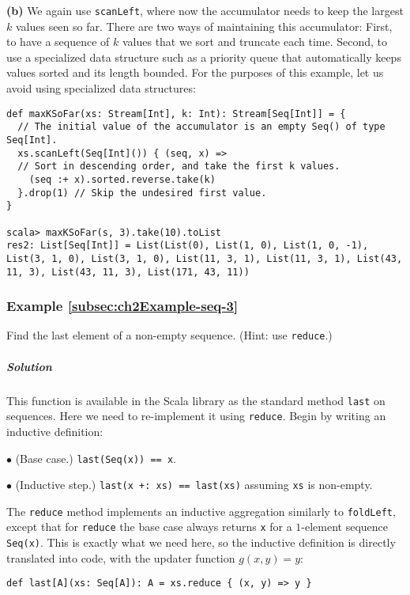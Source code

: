 \textbf{(b)} We again use \lstinline!scanLeft!, where now the accumulator
needs to keep the largest $k$ values seen so far. There are two ways
of maintaining this accumulator: First, to have a sequence of $k$
values that we sort and truncate each time. Second, to use a specialized
data structure such as a priority queue that automatically keeps values
sorted and its length bounded. For the purposes of this example, let
us avoid using specialized data structures:
\begin{lstlisting}
def maxKSoFar(xs: Stream[Int], k: Int): Stream[Seq[Int]] = {
  // The initial value of the accumulator is an empty Seq() of type Seq[Int].
  xs.scanLeft(Seq[Int]()) { (seq, x) =>
  // Sort in descending order, and take the first k values.
    (seq :+ x).sorted.reverse.take(k)
  }.drop(1) // Skip the undesired first value.
}

scala> maxKSoFar(s, 3).take(10).toList
res2: List[Seq[Int]] = List(List(0), List(1, 0), List(1, 0, -1), List(3, 1, 0), List(3, 1, 0), List(11, 3, 1), List(11, 3, 1), List(43, 11, 3), List(43, 11, 3), List(171, 43, 11)) 
\end{lstlisting}


\subsubsection{Example \label{subsec:ch2Example-seq-3}\ref{subsec:ch2Example-seq-3}}

Find the last element of a non-empty sequence. (Hint: use \lstinline!reduce!.)

\subparagraph{Solution}

This function is available in the Scala library as the standard method
\lstinline!last! on sequences. Here we need to re-implement it using
\lstinline!reduce!. Begin by writing an inductive definition:

$\bullet$ (Base case.) \lstinline!last(Seq(x)) == x!.

$\bullet$ (Inductive step.) \lstinline!last(x +: xs) == last(xs)!
assuming \lstinline!xs! is non-empty.

The \lstinline!reduce! method implements an inductive aggregation
similarly to \lstinline!foldLeft!, except that for \lstinline!reduce!
the base case  always returns \lstinline!x! for a $1$-element sequence
\lstinline!Seq(x)!. This is exactly what we need here, so the inductive
definition is directly translated into code, with the updater function
$g(x,y)=y$:
\begin{lstlisting}
def last[A](xs: Seq[A]): A = xs.reduce { (x, y) => y }
\end{lstlisting}


